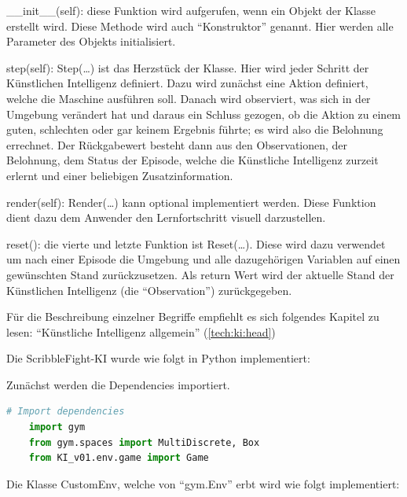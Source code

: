\begin{compactenum}
  \item \_\_init\_\_(self): diese Funktion wird aufgerufen, wenn ein Objekt der Klasse erstellt wird. Diese Methode wird auch ``Konstruktor'' genannt. Hier werden alle Parameter des Objekts initialisiert.
  \item step(self): Step(\dots) ist das Herzstück der Klasse. Hier wird jeder Schritt der Künstlichen Intelligenz definiert. Dazu wird zunächst eine Aktion definiert, welche die Maschine ausführen soll. Danach wird observiert, was sich in der Umgebung verändert hat und daraus ein Schluss gezogen, ob die Aktion zu einem guten, schlechten oder gar keinem Ergebnis führte; es wird also die Belohnung errechnet. Der Rückgabewert besteht dann aus den Observationen, der Belohnung, dem Status der Episode, welche die Künstliche Intelligenz zurzeit erlernt und einer beliebigen Zusatzinformation.
  \item render(self): Render(\dots) kann optional implementiert werden. Diese Funktion dient dazu dem Anwender den Lernfortschritt visuell darzustellen.
  \item reset(): die vierte und letzte Funktion ist Reset(\dots). Diese wird dazu verwendet um nach einer Episode die Umgebung und alle dazugehörigen Variablen auf einen gewünschten Stand zurückzusetzen. Als return Wert wird der aktuelle Stand der Künstlichen Intelligenz (die ``Observation'') zurückgegeben.
\end{compactenum}

Für die Beschreibung einzelner Begriffe empfiehlt es sich folgendes Kapitel zu lesen: ``Künstliche Intelligenz allgemein'' (\ref {tech:ki:head})

Die ScribbleFight-KI wurde wie folgt in Python implementiert:

Zunächst werden die Dependencies importiert.
\begin{lstlisting}[language=Python,label=lst:maap:scribblefightki,caption=ScribbleFight-KI OpenAI-Gym Environment]
    # Import dependencies
    import gym
    from gym.spaces import MultiDiscrete, Box
    from KI_v01.env.game import Game
\end{lstlisting}

Die Klasse CustomEnv, welche von ``gym.Env'' erbt wird wie folgt implementiert:

